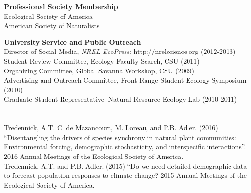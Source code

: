 \documentclass[margin,line]{resume}
\begin{document}
\begin{resume}
 \textbf{Professional Society Membership}\\
    	Ecological Society of America\\
	American Society of Naturalists


   \textbf{University Service and Public Outreach}\\
   	Director of Social Media, \textsl{NREL EcoPress}: http://nrelscience.org (2012-2013)\\
	Student Review Committee, Ecology Faculty Search, CSU (2011)\\
	Organizing Committee, Global Savanna Workshop, CSU (2009)\\
	Advertising and Outreach Committee, Front Range Student Ecology Symposium (2010)\\
	Graduate Student Representative, Natural Resource Ecology Lab (2010-2011)
  
     \section{\textmd{\textsf{\color{MidnightBlue}{Presentations}}}}
        Tredennick, A.T. C. de Mazancourt, M. Loreau, and P.B. Adler. (2016) ``Disentangling the drivers of species synchrony in natural plant communities: Environmental forcing, demographic stochasticity, and interspecific interactions''. 2016 Annual Meetings of the Ecological Society of America.\vspace{-6mm}\\%
        
    Tredennick, A.T. and P.B. Adler. (2015) ``Do we need detailed demographic data to forecast population responses to climate change? 2015 Annual Meetings of the Ecological Society of America.\vspace{-6mm}\\%
    

\end{resume}
\end{document}
